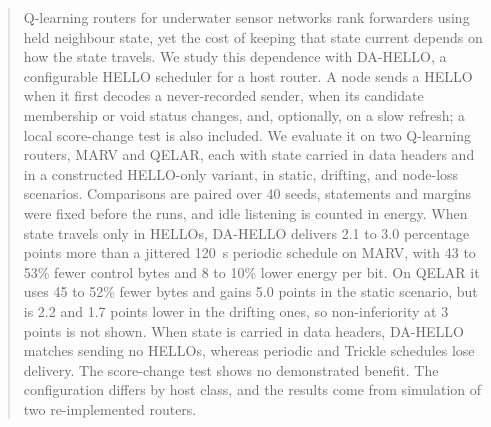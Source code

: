 \begin{abstract}
Q-learning routers for underwater sensor networks rank forwarders using held neighbour state, yet the cost of keeping that state current depends on how the state travels. We study this dependence with DA-HELLO, a configurable HELLO scheduler for a host router. A node sends a HELLO when it first decodes a never-recorded sender, when its candidate membership or void status changes, and, optionally, on a slow refresh; a local score-change test is also included. We evaluate it on two Q-learning routers, MARV and QELAR, each with state carried in data headers and in a constructed HELLO-only variant, in static, drifting, and node-loss scenarios. Comparisons are paired over 40 seeds, statements and margins were fixed before the runs, and idle listening is counted in energy. When state travels only in HELLOs, DA-HELLO delivers 2.1 to 3.0 percentage points more than a jittered 120~s periodic schedule on MARV, with 43 to 53\% fewer control bytes and 8 to 10\% lower energy per bit. On QELAR it uses 45 to 52\% fewer bytes and gains 5.0 points in the static scenario, but is 2.2 and 1.7 points lower in the drifting ones, so non-inferiority at 3 points is not shown. When state is carried in data headers, DA-HELLO matches sending no HELLOs, whereas periodic and Trickle schedules lose delivery. The score-change test shows no demonstrated benefit. The configuration differs by host class, and the results come from simulation of two re-implemented routers.
\end{abstract}
